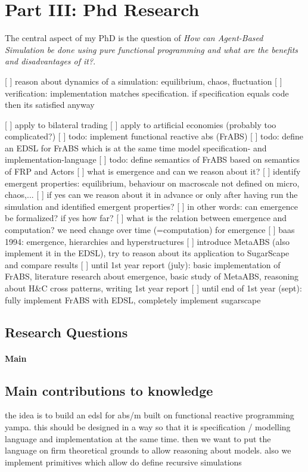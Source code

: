 \section{Part III: Phd Research} 
The central aspect of my PhD is the question of \textit{How can Agent-Based Simulation be done using pure functional programming and what are the benefits and disadvantages of it?}.

[ ] reason about dynamics of a simulation: equilibrium, chaos, fluctuation
[ ] verification: implementation matches specification. if specification equals code then its satisfied anyway

[ ] apply to bilateral trading
[ ] apply to artificial economies (probably too complicated?)
[ ] todo: implement functional reactive abs (FrABS)
[ ] todo: define an EDSL for FrABS which is at the same time model specification- and implementation-language
[ ] todo: define semantics of FrABS based on semantics of FRP and Actors
[ ] what is emergence and can we reason about it? 
[ ] identify emergent properties: equilibrium, behaviour on macroscale not defined on micro, chaos,...
[ ] if yes can we reason about it in advance or only after having run the simulation and identified emergent properties?
[ ] in other words: can emergence be formalized? if yes how far?
[ ] what is the relation between emergence and computation? we need change over time (=computation) for emergence
[ ] baas 1994: emergence, hierarchies and hyperstructures
[ ] introduce MetaABS (also implement it in the EDSL), try to reason about its application to SugarScape and compare results
[ ] until 1st year report (july): basic implementation of FrABS, literature research about emergence, basic study of MetaABS, reasoning about H&C cross patterns, writing 1st year report
[ ] until end of 1st year (sept): fully implement FrABS with EDSL, completely implement sugarscape

\subsection{Research Questions}
\paragraph{Main} 

\subsection{Main contributions to knowledge}
the idea is to build an edsl for abs/m built on functional reactive programming yampa. this should be designed in a way so that it is specification / modelling language and implementation at the same time. then we want to put the language on firm theoretical grounds to allow reasoning about models. also we implement primitives which allow do define recursive simulations

